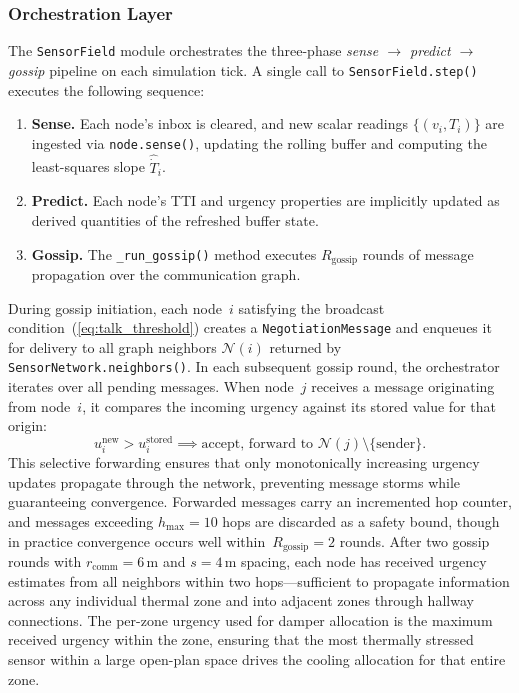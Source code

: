 \documentclass[conference]{IEEEtran}
\begin{document}
\subsubsection{\textbf{Orchestration Layer}}
The \texttt{SensorField} module orchestrates the three-phase \textit{sense $\rightarrow$ predict $\rightarrow$ gossip} pipeline on each simulation tick. A single call to \texttt{SensorField.step()} executes the following sequence:
\begin{enumerate}
    \item \textbf{Sense.} Each node's inbox is cleared, and new scalar readings $\{(v_i, T_i)\}$ are ingested via \texttt{node.sense()}, updating the rolling buffer and computing the least-squares slope $\hat{\dot{T}}_i$.
    \item \textbf{Predict.} Each node's TTI and urgency properties are implicitly updated as derived quantities of the refreshed buffer state.
    \item \textbf{Gossip.} The \texttt{\_run\_gossip()} method executes $R_{\text{gossip}}$ rounds of message propagation over the communication graph.
\end{enumerate}
During gossip initiation, each node~$i$ satisfying the broadcast condition~(\ref{eq:talk_threshold}) creates a \texttt{NegotiationMessage} and enqueues it for delivery to all graph neighbors $\mathcal{N}(i)$ returned by \texttt{SensorNetwork.neighbors()}. In each subsequent gossip round, the orchestrator iterates over all pending messages. When node~$j$ receives a message originating from node~$i$, it compares the incoming urgency against its stored value for that origin:
\begin{equation}
    u_i^{\text{new}} > u_i^{\text{stored}} \implies \text{accept, forward to } \mathcal{N}(j) \setminus \{\text{sender}\}.
    \label{eq:selective_forward}
\end{equation}
This selective forwarding ensures that only monotonically increasing urgency updates propagate through the network, preventing message storms while guaranteeing convergence. Forwarded messages carry an incremented hop counter, and messages exceeding $h_{\max} = 10$ hops are discarded as a safety bound, though in practice convergence occurs well within~$R_{\text{gossip}} = 2$ rounds.
After two gossip rounds with $r_{\text{comm}} = 6\,\text{m}$ and $s = 4\,\text{m}$ spacing, each node has received urgency estimates from all neighbors within two hops---sufficient to propagate information across any individual thermal zone and into adjacent zones through hallway connections. The per-zone urgency used for damper allocation is the maximum received urgency within the zone, ensuring that the most thermally stressed sensor within a large open-plan space drives the cooling allocation for that entire zone.
\end{document}
